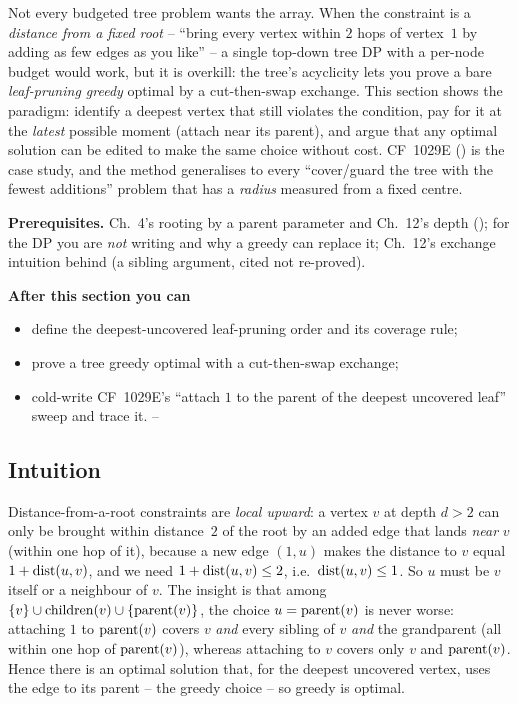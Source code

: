 \begin{topicintro}
Not every budgeted tree problem wants the array. When the constraint is a
\emph{distance from a fixed root} -- ``bring every vertex within $2$ hops of
vertex~$1$ by adding as few edges as you like'' -- a single top-down tree DP
with a per-node budget would work, but it is overkill: the tree's acyclicity lets
you prove a bare \emph{leaf-pruning greedy} optimal by a cut-then-swap exchange.
This section shows the paradigm: identify a deepest vertex that still violates the
condition, pay for it at the \emph{latest} possible moment (attach near its
parent), and argue that any optimal solution can be edited to make the same choice
without cost. CF~1029E () is the case study, and the
method generalises to every ``cover/guard the tree with the fewest additions''
problem that has a \emph{radius} measured from a fixed centre.

\textbf{Prerequisites.} Ch.~4's rooting by a parent parameter and Ch.~12's
depth ();  for the DP you are \emph{not}
writing and why a greedy can replace it; Ch.~12's exchange intuition behind
 (a sibling argument, cited not re-proved).

\textbf{After this section you can}
\begin{itemize}[nosep]
  \item define the deepest-uncovered leaf-pruning order and its coverage rule; \hfill{}
  \item prove a tree greedy optimal with a cut-then-swap exchange; \hfill{}
  \item cold-write CF~1029E's ``attach $1$ to the parent of the deepest uncovered
        leaf'' sweep and trace it. \hfill{}--
\end{itemize}
\end{topicintro}

\subsection{Intuition}

Distance-from-a-root constraints are \emph{local upward}: a vertex $v$ at depth
$d > 2$ can only be brought within distance~$2$ of the root by an added edge that
lands \emph{near} $v$ (within one hop of it), because a new edge $(1,u)$ makes the
distance to $v$ equal $1 + \operatorname{dist}(u,v)$, and we need $1 + \operatorname{dist}(u,v) \le 2$, i.e.\
$\operatorname{dist}(u,v) \le 1$. So $u$ must be $v$ itself or a neighbour of $v$. The
\term{exchange} insight is that among $\{v\} \cup \operatorname{children}(v)\cup\{\operatorname{parent}(v)\}$,
the choice $u = \operatorname{parent}(v)$ is never worse: attaching $1$ to $\operatorname{parent}(v)$ covers
$v$ \emph{and} every sibling of $v$ \emph{and} the grandparent (all within one hop
of $\operatorname{parent}(v)$), whereas attaching to $v$ covers only $v$ and $\operatorname{parent}(v)$. Hence
there is an optimal solution that, for the deepest uncovered vertex, uses the edge
to its parent -- the greedy choice -- so greedy is optimal.

